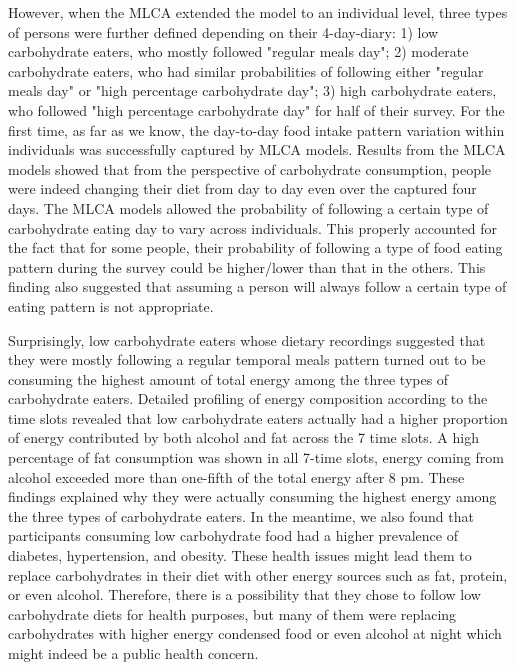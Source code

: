 However, when the MLCA extended the model to an individual level, three types of persons were further defined depending on their 4-day-diary: 1) low carbohydrate eaters, who mostly followed "regular meals day"; 2) moderate carbohydrate eaters, who had similar probabilities of following either "regular meals day" or "high percentage carbohydrate day"; 3) high carbohydrate eaters, who followed "high percentage carbohydrate day" for half of their survey. For the first time, as far as we know, the day-to-day food intake pattern variation within individuals was successfully captured by MLCA models. Results from the MLCA models showed that from the perspective of carbohydrate consumption, people were indeed changing their diet from day to day even over the captured four days. The MLCA models allowed the probability of following a certain type of carbohydrate eating day to vary across individuals. This properly accounted for the fact that for some people, their probability of following a type of food eating pattern during the survey could be higher/lower than that in the others. This finding also suggested that assuming a person will always follow a certain type of eating pattern is not appropriate.

Surprisingly, low carbohydrate eaters whose dietary recordings suggested that they were mostly following a regular temporal meals pattern turned out to be consuming the highest amount of total energy among the three types of carbohydrate eaters. Detailed profiling of energy composition according to the time slots revealed that low carbohydrate eaters actually had a higher proportion of energy contributed by both alcohol and fat across the 7 time slots. A high percentage of fat consumption was shown in all 7-time slots, energy coming from alcohol exceeded more than one-fifth of the total energy after 8 pm. These findings explained why they were actually consuming the highest energy among the three types of carbohydrate eaters. In the meantime, we also found that participants consuming low carbohydrate food had a higher prevalence of diabetes, hypertension, and obesity. These health issues might lead them to replace carbohydrates in their diet with other energy sources such as fat, protein, or even alcohol. Therefore, there is a possibility that they chose to follow low carbohydrate diets for health purposes, but many of them were replacing carbohydrates with higher energy condensed food or even alcohol at night which might indeed be a public health concern. 

